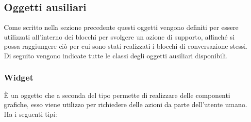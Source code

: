 \subsection{Oggetti ausiliari}
Come scritto nella sezione precedente questi oggetti vengono definiti per essere utilizzati all’interno dei blocchi per svolgere un azione di supporto, affinché si possa raggiungere ciò per cui sono stati realizzati i blocchi di conversazione stessi.\\
Di seguito vengono indicate tutte le classi degli oggetti ausiliari disponibili.

\subsubsection*{Widget}
È un oggetto che a seconda del tipo permette di realizzare delle componenti grafiche, esso viene utilizzo per richiedere delle azioni da parte dell’utente umano.
Ha i seguenti tipi:
